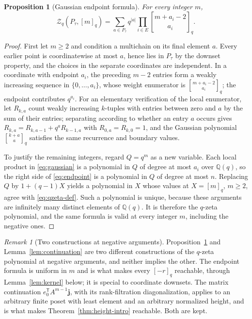 \documentclass[11pt]{article}
\numberwithin{equation}{section}
\newtheorem{proposition}[theorem]{Proposition}
\theoremstyle{definition}
\theoremstyle{remark}
\newtheorem{remark}[theorem]{Remark}
\newcommand{\Q}{\mathbb Q}
\newcommand{\qint}[1]{[#1]_q}
\newcommand{\Zeta}{\mathcal Z}
\newcommand{\qbinom}[2]{\genfrac{[}{]}{0pt}{}{#1}{#2}_{q}}
\begin{document}
\begin{proposition}[Gaussian endpoint formula]
\label{prop:endpoint}
For every integer $m$,
\begin{equation}
 \Zeta_q(P_\tau,\qint m)=\sum_{a\in P_\tau}q^{|a|}
                     \prod_{i\in E}\qbinom{m+a_i-2}{a_i}.
 \label{eq:endpoint}
\end{equation}
\end{proposition}

\begin{proof}
First let $m\ge2$ and condition a multichain on its final element $a$. Every
earlier point is coordinatewise at most $a$, hence lies in $P_\tau$ by the
downset property, and the choices in the separate coordinates are independent.
In a coordinate with endpoint $a_i$, the preceding $m-2$ entries form a weakly
increasing sequence in $\{0,\ldots,a_i\}$, whose weight enumerator is
$\qbinom{m+a_i-2}{a_i}$; the endpoint contributes $q^{a_i}$. For an elementary
verification of the local enumerator, let $R_{k,a}$ count weakly increasing
$k$-tuples with entries between zero and $a$ by the sum of their entries;
separating according to whether an entry $a$ occurs gives
$R_{k,a}=R_{k,a-1}+q^aR_{k-1,a}$ with $R_{0,a}=R_{k,0}=1$, and the Gaussian
polynomial $\qbinom{k+a}{a}$ satisfies the same recurrence and boundary
values.

To justify the remaining integers, regard $Q=q^m$ as a new variable. Each
local product in \eqref{eq:gaussian} is a polynomial in $Q$ of degree at most
$a_i$ over $\Q(q)$, so the right side of \eqref{eq:endpoint} is a polynomial
in $Q$ of degree at most $n$. Replacing $Q$ by $1+(q-1)X$ yields a polynomial
in $X$ whose values at $X=\qint m$, $m\ge2$, agree with \eqref{eq:qzeta-def}.
Such a polynomial is unique, because these arguments are infinitely many
distinct elements of $\Q(q)$. It is therefore the $q$-zeta polynomial, and the
same formula is valid at every integer $m$, including the negative ones.
\end{proof}

\begin{remark}[Two constructions at negative arguments]
\label{rem:two-constructions}
Proposition~\ref{prop:endpoint} and Lemma~\ref{lem:continuation} are two
different constructions of the $q$-zeta polynomial at negative arguments, and
neither implies the other. The endpoint formula is uniform in $m$ and is what
makes every $\qint{-r}$ reachable, through Lemma~\ref{lem:kernel} below; it is
special to coordinate downsets. The matrix continuation
$e_0^{\mathsf T}A^{m-1}\mathbf j$, with its rank-filtration diagonalization,
applies to an arbitrary finite poset with least element and an arbitrary
normalized height, and is what makes Theorem~\ref{thm:height-intro}
reachable. Both are kept.
\end{remark}
\end{document}
